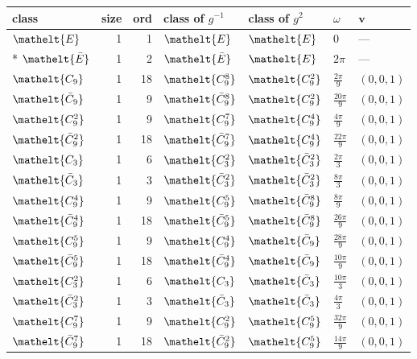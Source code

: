 \documentclass[10pt,a4paper]{article}
\numberwithin{equation}{section}
\newcommand{\eltfont}[1]{{\let\sigma\eltsigma\mathelt{#1}}}
\newcommand{\cls}[1]{\eltfont{#1}}
\newcommand{\dirvec}[3]{(#1, #2, #3)}
\newcommand{\vv}{\mathbf{v}}
\newcommand{\barred}[1]{\bar{#1}}
\begin{document}
{\renewcommand{\arraystretch}{1.3}\begin{longtable}{@{}lrrllll@{}}\toprule
class & size & ord & class of $g^{-1}$ & class of $g^{2}$ & $\omega$ & $\vv$\\\midrule\endhead
\bottomrule\endfoot\endlastfoot
$\cls{E}$ & 1 & 1 & $\cls{E}$ & $\cls{E}$ & $0$ & ---\\*
$\cls{\barred{E}}$ & 1 & 2 & $\cls{\barred{E}}$ & $\cls{E}$ & $2\pi$ & ---\\
$\cls{C_{9}}$ & 1 & 18 & $\cls{C_{9}^{8}}$ & $\cls{C_{9}^{2}}$ & $\tfrac{2\pi}{9}$ & $\dirvec{0}{0}{1}$\\
$\cls{\barred{C}_{9}}$ & 1 & 9 & $\cls{\barred{C}_{9}^{8}}$ & $\cls{C_{9}^{2}}$ & $\tfrac{20\pi}{9}$ & $\dirvec{0}{0}{1}$\\
$\cls{C_{9}^{2}}$ & 1 & 9 & $\cls{C_{9}^{7}}$ & $\cls{C_{9}^{4}}$ & $\tfrac{4\pi}{9}$ & $\dirvec{0}{0}{1}$\\
$\cls{\barred{C}_{9}^{2}}$ & 1 & 18 & $\cls{\barred{C}_{9}^{7}}$ & $\cls{C_{9}^{4}}$ & $\tfrac{22\pi}{9}$ & $\dirvec{0}{0}{1}$\\
$\cls{C_{3}}$ & 1 & 6 & $\cls{C_{3}^{2}}$ & $\cls{\barred{C}_{3}^{2}}$ & $\tfrac{2\pi}{3}$ & $\dirvec{0}{0}{1}$\\
$\cls{\barred{C}_{3}}$ & 1 & 3 & $\cls{\barred{C}_{3}^{2}}$ & $\cls{\barred{C}_{3}^{2}}$ & $\tfrac{8\pi}{3}$ & $\dirvec{0}{0}{1}$\\
$\cls{C_{9}^{4}}$ & 1 & 9 & $\cls{C_{9}^{5}}$ & $\cls{\barred{C}_{9}^{8}}$ & $\tfrac{8\pi}{9}$ & $\dirvec{0}{0}{1}$\\
$\cls{\barred{C}_{9}^{4}}$ & 1 & 18 & $\cls{\barred{C}_{9}^{5}}$ & $\cls{\barred{C}_{9}^{8}}$ & $\tfrac{26\pi}{9}$ & $\dirvec{0}{0}{1}$\\
$\cls{C_{9}^{5}}$ & 1 & 9 & $\cls{C_{9}^{4}}$ & $\cls{\barred{C}_{9}}$ & $\tfrac{28\pi}{9}$ & $\dirvec{0}{0}{1}$\\
$\cls{\barred{C}_{9}^{5}}$ & 1 & 18 & $\cls{\barred{C}_{9}^{4}}$ & $\cls{\barred{C}_{9}}$ & $\tfrac{10\pi}{9}$ & $\dirvec{0}{0}{1}$\\
$\cls{C_{3}^{2}}$ & 1 & 6 & $\cls{C_{3}}$ & $\cls{\barred{C}_{3}}$ & $\tfrac{10\pi}{3}$ & $\dirvec{0}{0}{1}$\\
$\cls{\barred{C}_{3}^{2}}$ & 1 & 3 & $\cls{\barred{C}_{3}}$ & $\cls{\barred{C}_{3}}$ & $\tfrac{4\pi}{3}$ & $\dirvec{0}{0}{1}$\\
$\cls{C_{9}^{7}}$ & 1 & 9 & $\cls{C_{9}^{2}}$ & $\cls{C_{9}^{5}}$ & $\tfrac{32\pi}{9}$ & $\dirvec{0}{0}{1}$\\
$\cls{\barred{C}_{9}^{7}}$ & 1 & 18 & $\cls{\barred{C}_{9}^{2}}$ & $\cls{C_{9}^{5}}$ & $\tfrac{14\pi}{9}$ & $\dirvec{0}{0}{1}$\\

\end{longtable}}
\end{document}
